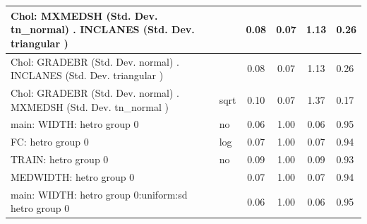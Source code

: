 \begin{table}
\begin{center}
\begin{tabular}{|l|l|c|c|c|l|}
			\hline
			 Chol: MXMEDSH (Std. Dev. tn_normal) . INCLANES (Std. Dev.   triangular ) &  & 0.08 & 0.07 & 1.13 & 0.26 \\
			\hline
			 Chol: GRADEBR (Std. Dev. normal) . INCLANES (Std. Dev.   triangular ) &  & 0.08 & 0.07 & 1.13 & 0.26 \\
			\hline
			 Chol: GRADEBR (Std. Dev. normal) . MXMEDSH (Std. Dev.   tn_normal ) & sqrt & 0.10 & 0.07 & 1.37 & 0.17 \\
			\hline
			main: WIDTH: hetro group 0 & no & 0.06 & 1.00 & 0.06 & 0.95 \\
			\hline
			FC: hetro group 0 & log & 0.07 & 1.00 & 0.07 & 0.94 \\
			\hline
			TRAIN: hetro group 0 & no & 0.09 & 1.00 & 0.09 & 0.93 \\
			\hline
			MEDWIDTH: hetro group 0 &  & 0.07 & 1.00 & 0.07 & 0.94 \\
			\hline
			main: WIDTH: hetro group 0:uniform:sd  hetro group 0 &  & 0.06 & 1.00 & 0.06 & 0.95 \\
			\hline
		\end{tabular}
	\end{center}
\end{table}